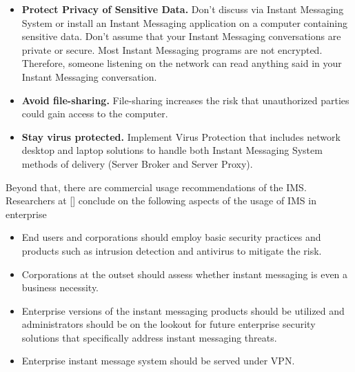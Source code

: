 \begin{itemize}
    \item \textbf{Protect Privacy of Sensitive Data.}
    Don't discuss via Instant Messaging System or install an Instant Messaging application on a computer containing
    sensitive data.
    Don't assume that your Instant Messaging conversations are private or secure.
    Most Instant Messaging programs are not encrypted.
    Therefore, someone listening on the network can read anything said in your Instant Messaging conversation.
    \item \textbf{Avoid file-sharing.}
    File-sharing increases the risk that unauthorized parties could gain access to the computer.
    \item \textbf{Stay virus protected.} Implement Virus Protection that includes network desktop and laptop solutions to handle both Instant Messaging System
    methods of delivery (Server Broker and Server Proxy).
\end{itemize}

Beyond that, there are commercial usage recommendations of the IMS\@.
Researchers at [\cite{hindocha2003malicious}] conclude on the following aspects of the usage of IMS in enterprise
\begin{itemize}
    \item End users and corporations should employ basic security practices and products such as
    intrusion detection and antivirus to mitigate the risk.
    \item Corporations at the outset should assess whether instant messaging is even a business necessity.
    \item Enterprise versions of
    the instant messaging products should be utilized and administrators should be on the lookout for
    future enterprise security solutions that specifically address instant messaging threats.
    \item Enterprise instant message system should be served under VPN\@.
\end{itemize}